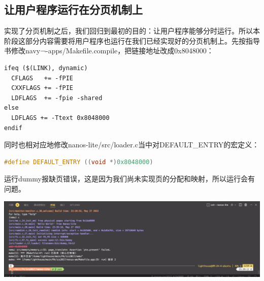 \documentclass[UTF8,a4paper,10pt]{ctexart}
\begin{document}
\subsection{让用户程序运行在分页机制上}
实现了分页机制之后，我们回归到最初的目的：让用户程序能够分时运行。所以本阶段这部分内容需要将用户程序也运行在我们已经实现好的分页机制上。先按指导书修改navy¬-apps/Makefile.compile，把链接地址改成0x8048000：
\begin{lstlisting}
ifeq ($(LINK), dynamic)
  CFLAGS   += -fPIE
  CXXFLAGS += -fPIE
  LDFLAGS  += -fpie -shared
else
  LDFLAGS += -Ttext 0x8048000
endif
\end{lstlisting}
同时也相对应地修改nanos-lite/src/loader.c当中对DEFAULT\_ENTRY的宏定义：
\begin{lstlisting}[language = C++]
#define DEFAULT_ENTRY ((void *)0x8048000)
\end{lstlisting}
运行dummy报缺页错误，这是因为我们尚未实现页的分配和映射，所以运行会有问题。
\begin{center}
  \includegraphics*[scale = 0.28]{img/6}
\end{center}
\end{document}
